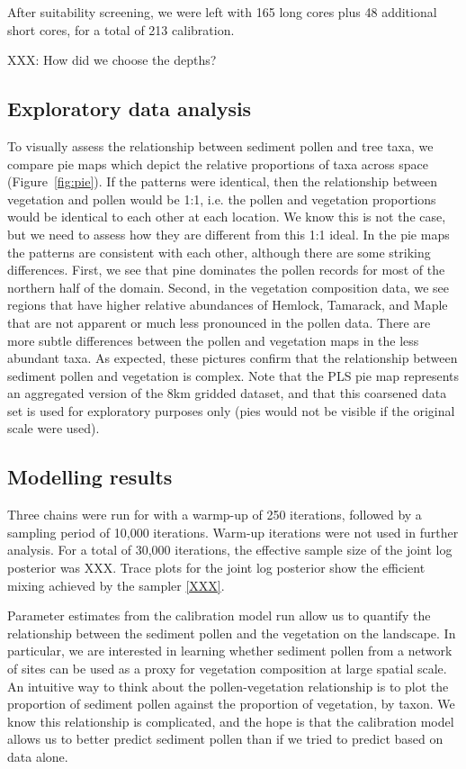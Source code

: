 \documentclass[12pt]{article}
\begin{document}
After suitability screening, we were left with 165 long cores plus 48
additional short cores, for a total of 213 calibration.

XXX: How did we choose the depths?

\subsection{Exploratory data analysis}

To visually assess the relationship between sediment pollen and tree
taxa, we compare pie maps which depict the relative proportions of
taxa across space (Figure~\ref{fig:pie}). If the patterns were
identical, then the relationship between vegetation and pollen would
be 1:1, i.e. the pollen and vegetation proportions would be identical
to each other at each location. We know this is not the case, but we
need to assess how they are different from this 1:1 ideal. In the pie
maps the patterns are consistent with each other, although there are
some striking differences. First, we see that pine dominates the
pollen records for most of the northern half of the domain. Second, in
the vegetation composition data, we see regions that have higher
relative abundances of Hemlock, Tamarack, and Maple that are not
apparent or much less pronounced in the pollen data. There are more
subtle differences between the pollen and vegetation maps in the less
abundant taxa. As expected, these pictures confirm that the
relationship between sediment pollen and vegetation is complex. Note
that the PLS pie map represents an aggregated version of the 8km
gridded dataset, and that this coarsened data set is used for
exploratory purposes only (pies would not be visible if the original
scale were used).

\subsection{Modelling results}

Three chains were run for with a warmp-up of 250 iterations, followed
by a sampling period of 10,000 iterations. Warm-up iterations were not
used in further analysis. For a total of 30,000 iterations, the
effective sample size of the joint log posterior was XXX. Trace plots
for the joint log posterior show the efficient mixing achieved by the
sampler \ref{XXX}.

Parameter estimates from the calibration model run allow us to
quantify the relationship between the sediment pollen and the
vegetation on the landscape. In particular, we are interested in
learning whether sediment pollen from a network of sites can be used
as a proxy for vegetation composition at large spatial scale. An
intuitive way to think about the pollen-vegetation relationship is to
plot the proportion of sediment pollen against the proportion of
vegetation, by taxon. We know this relationship is complicated, and
the hope is that the calibration model allows us to better predict
sediment pollen than if we tried to predict based on data alone. 
\end{document}
